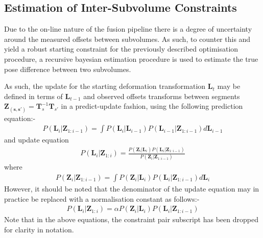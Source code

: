 \subsection{Estimation of Inter-Subvolume Constraints}
Due to the on-line nature of the fusion pipeline there is a degree of uncertainty around the measured offsets between subvolumes. As such, to 
counter this and yield a robust starting constraint for the previously described optimisation procedure, a recursive bayesian estimation 
procedure is used to estimate the true pose difference between two subvolumes.

As such, the update for the starting deformation transformation $\mathbf{L}_{t}$ may be defined in 
terms of $\mathbf{L}_{t-1}$ and observed offsets transforms between segments $\mathbf{Z_{(s, s')}} = \mathbf{T}_{s}^{-1}\mathbf{T}_{s'}$  in a predict-update fashion, using the following prediction equation:-
\begin{equation}
\begin{split}
P(\mathbf{L}_{i} | \mathbf{Z}_{1:i-1}) = \int P(\mathbf{L}_{i} | \mathbf{L}_{i-1})P(\mathbf{L}_{i-1} | \mathbf{Z}_{1:i-1}) d\mathbf{L}_{i-1}
\end{split}
\end{equation}
and update equation
\begin{equation}
\begin{split}
P(\mathbf{L}_{i} | \mathbf{Z}_{1:i}) = \frac{P(\mathbf{Z}_{i} | \mathbf{L}_{i})P(\mathbf{L}_{i} | \mathbf{Z}_{1:i-1})}{P(\mathbf{Z}_{i} | \mathbf{Z}_{1:i-1})}
\end{split}
\end{equation}
where
\begin{equation}
\begin{split}
P(\mathbf{Z}_{i} | \mathbf{Z}_{1:i-1}) = \int P(\mathbf{Z}_{i} | \mathbf{L}_{i})P(\mathbf{L}_{i} | \mathbf{Z}_{1:i-1}) d\mathbf{L}_{i}
\end{split}
\end{equation}
However, it should be noted that the denominator of the update equation may in practice be replaced with a normalisation constant as follows:-
\begin{equation}
\begin{split}
P(\mathbf{L}_{i} | \mathbf{Z}_{1:i}) = \alpha P(\mathbf{Z}_{i} | \mathbf{L}_{i})P(\mathbf{L}_{i} | \mathbf{Z}_{1:i-1})
\end{split}
\end{equation}
Note that in the above equations, the constraint pair subscript has been dropped for clarity in notation.

